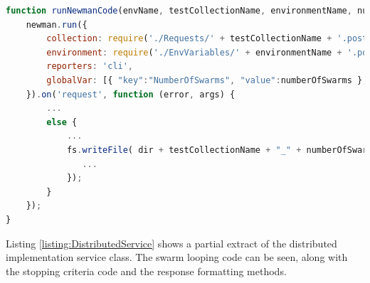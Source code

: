 \documentclass[oneside,12pt]{book}
\begin{document}
\begin{lstlisting}[basicstyle=\footnotesize, language=JavaScript]
function runNewmanCode(envName, testCollectionName, environmentName, numberOfSwarms, numberOfParticles, baseUrlsSting, endpoint) {
    newman.run({
        collection: require('./Requests/' + testCollectionName + '.postman_collection.json'),
        environment: require('./EnvVariables/' + environmentName + '.postman_environment.json'),
        reporters: 'cli',
        globalVar: [{ "key":"NumberOfSwarms", "value":numberOfSwarms }, {"key":"endpoint", "value": endpoint}, { "key":"NumberOfParticles", "value": numberOfParticles}, { "key":"BaseUrls", "value": baseUrlsSting}]
    }).on('request', function (error, args) {
        ...
        else {
            ...
            fs.writeFile( dir + testCollectionName + "_" + numberOfSwarms + "_" + numberOfParticles + '.result.json', args.response.stream, function (error) {
               ...
            });
        }
    });
}
\end{lstlisting}
\label{listing:NewmanImpl}

Listing \ref{listing:DistributedService} shows a partial extract of the distributed implementation service class. The swarm looping code can be seen, along with the stopping criteria code and the response formatting methods. 
\end{document}
